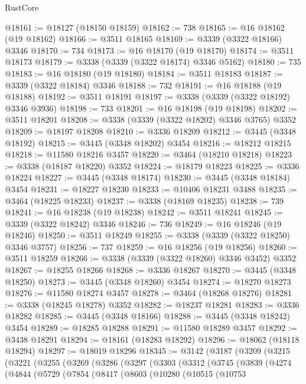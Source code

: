 \begin{lexlean}{RustCore}
\begin{coremodule}
@18161 := @18127 (@18150 @18159)
@18162 := 738
@18165 := @16 @18162 (@19 @18162)
@18166 := @3511 @18165
@18169 := @3339 (@3322 @18166) @3346
@18170 := 734
@18173 := @16 @18170 (@19 @18170)
@18174 := @3511 @18173
@18179 := @3338 (@3339 (@3322 @18174) @3346 @5162)
@18180 := 735
@18183 := @16 @18180 (@19 @18180)
@18184 := @3511 @18183
@18187 := @3339 (@3322 @18184) @3346
@18188 := 732
@18191 := @16 @18188 (@19 @18188)
@18192 := @3511 @18191
@18197 := @3338 (@3339 (@3322 @18192) @3346 @3936)
@18198 := 733
@18201 := @16 @18198 (@19 @18198)
@18202 := @3511 @18201
@18208 := @3338 (@3339 (@3322 @18202) @3346 @3765) @3352
@18209 := @18197 @18208
@18210 := @3336 @18209
@18212 := @3445 (@3348 @18192)
@18215 := @3445 (@3348 @18202) @3454
@18216 := @18212 @18215
@18218 := @11580 @18216 @3457
@18220 := @3464 (@18210 @18218)
@18223 := @3338 (@18187 @18220) @3352
@18224 := @18179 @18223
@18225 := @3336 @18224
@18227 := @3445 (@3348 @18174)
@18230 := @3445 (@3348 @18184) @3454
@18231 := @18227 @18230
@18233 := @10406 @18231 @3488
@18235 := @3464 (@18225 @18233)
@18237 := @3338 (@18169 @18235)
@18238 := 739
@18241 := @16 @18238 (@19 @18238)
@18242 := @3511 @18241
@18245 := @3339 (@3322 @18242) @3346
@18246 := 736
@18249 := @16 @18246 (@19 @18246)
@18250 := @3511 @18249
@18255 := @3338 (@3339 (@3322 @18250) @3346 @3757)
@18256 := 737
@18259 := @16 @18256 (@19 @18256)
@18260 := @3511 @18259
@18266 := @3338 (@3339 (@3322 @18260) @3346 @3452) @3352
@18267 := @18255 @18266
@18268 := @3336 @18267
@18270 := @3445 (@3348 @18250)
@18273 := @3445 (@3348 @18260) @3454
@18274 := @18270 @18273
@18276 := @11580 @18274 @3457
@18278 := @3464 (@18268 @18276)
@18281 := @3338 (@18245 @18278) @3352
@18282 := @18237 @18281
@18283 := @3336 @18282
@18285 := @3445 (@3348 @18166)
@18288 := @3445 (@3348 @18242) @3454
@18289 := @18285 @18288
@18291 := @11580 @18289 @3457
@18292 := @3438 @18291
@18294 := @18161 (@18283 @18292)
@18296 := @18062 (@18118 @18294)
@18297 := @18019 @18296
@18345 := @3142
    (@3187
      (@3209
        (@3215
          (@3221
            (@3255
              (@3269
                (@3286
                  (@3297
                    (@3303
                      (@3312
                        (@3745
                          (@3839
                            (@4274
                              (@4844
                                (@5729
                                  (@7854
                                    (@8417
                                      (@8603
                                        (@10280
                                          (@10515
                                            (@10753

\end{coremodule}
\end{lexlean}
